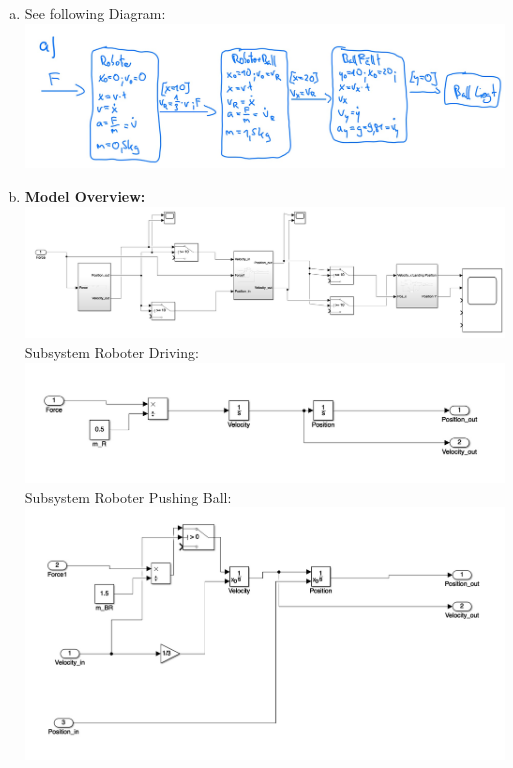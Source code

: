 \documentclass[12pt]{article}
\begin{document}
\begin{enumerate}[a)]
  \item
      See following Diagram:\\
    \includegraphics[scale = 0.23]{pictures/pa4a}\\
  \item
      \textbf{Model Overview:}\\
    \includegraphics[scale = 0.19]{pictures/model1}\\
    \newpage
    Subsystem Roboter Driving:\\
    \includegraphics[scale = 0.29]{pictures/model2}\\
      Subsystem Roboter Pushing Ball:\\
    \includegraphics[scale = 0.29]{pictures/model3}\\

\end{enumerate}
\end{document}
